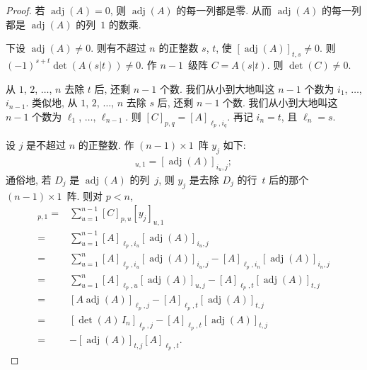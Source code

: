 \begin{proof}
    若 \(\operatorname{adj} {(A)} = 0\),
    则 \(\operatorname{adj} {(A)}\) 的每一列都是零.
    从而 \(\operatorname{adj} {(A)}\)
    的每一列都是
    \(\operatorname{adj} {(A)}\) 的列~\(1\) 的数乘.

    下设 \(\operatorname{adj} {(A)} \neq 0\).
    则有不超过 \(n\) 的正整数 \(s\), \(t\),
    使 \([\operatorname{adj} {(A)}]_{t,s} \neq 0\).
    则 \((-1)^{s+t} \det {(A(s|t))} \neq 0\).
    作 \(n-1\)~级阵 \(C = A(s|t)\).
    则 \(\det {(C)} \neq 0\).

    从 \(1\), \(2\), \(\dots\), \(n\)
    去除 \(t\) 后, 还剩 \(n - 1\) 个数.
    我们从小到大地叫这 \(n - 1\) 个数为
    \(i_1\), \(\dots\), \(i_{n-1}\).
    类似地, 从 \(1\), \(2\), \(\dots\), \(n\)
    去除 \(s\) 后, 还剩 \(n - 1\) 个数.
    我们从小到大地叫这 \(n - 1\) 个数为
    \(\ell_1\), \(\dots\), \(\ell_{n-1}\).
    则 \([C]_{p,q} = [A]_{\ell_p,i_q}\).
    再记 \(i_n = t\), 且 \(\ell_n = s\).

    设 \(j\) 是不超过 \(n\) 的正整数.
    作 \((n-1) \times 1\)~阵 \(y_j\) 如下:
    \begin{align*}
        [y_j]_{u,1} = [\operatorname{adj} {(A)}]_{i_u,j};
    \end{align*}
    通俗地, 若 \(D_j\) 是
    \(\operatorname{adj} {(A)}\) 的列~\(j\),
    则 \(y_j\) 是去除 \(D_j\) 的行~\(t\) 后的那个
    \((n-1) \times 1\)~阵.
    则对 \(p < n\),
    \begin{align*}
        [C y_j]_{p,1}
        = {} &
        \sum_{u=1}^{n-1} {[C]_{p,u} [y_j]_{u,1}}
        \\
        = {} &
        \sum_{u=1}^{n-1}
        {[A]_{\ell_p,i_u} [\operatorname{adj} {(A)}]_{i_u,j}}
        \\
        = {} &
        \sum_{u=1}^{n}
        {[A]_{\ell_p,i_u} [\operatorname{adj} {(A)}]_{i_u,j}}
        - [A]_{\ell_p,i_n} [\operatorname{adj} {(A)}]_{i_n,j}
        \\
        = {} &
        \sum_{u=1}^{n}
        {[A]_{\ell_p,u} [\operatorname{adj} {(A)}]_{u,j}}
        - [A]_{\ell_p,t} [\operatorname{adj} {(A)}]_{t,j}
        \\
        = {} &
        [A \operatorname{adj} {(A)}]_{\ell_p,j}
        - [A]_{\ell_p,t} [\operatorname{adj} {(A)}]_{t,j}
        \\
        = {} &
        [\det {(A)}\, I_n]_{\ell_p,j}
        - [A]_{\ell_p,t} [\operatorname{adj} {(A)}]_{t,j}
        \\
        = {} &
        {- [\operatorname{adj} {(A)}]_{t,j} [A]_{\ell_p,t}}.
    \end{align*}


\end{proof}

